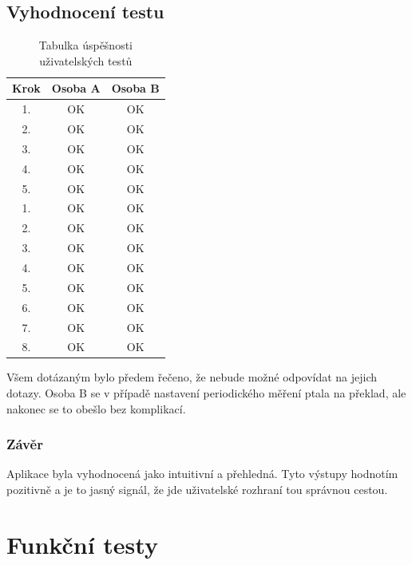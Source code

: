 \subsection{Vyhodnocení testu}

\begin{table}[h]
	\begin{center}
		\begin{tabular}{|c|c|c|}
			\hline
				{\bf Krok} & {\bf Osoba A} & {\bf Osoba B}\\
			\hline \hline
				1. & OK & OK\\
				\hline
				2. & OK & OK\\
				\hline
				3. & OK & OK\\
				\hline
				4. & OK & OK\\
				\hline
				5. & OK & OK\\
				\hline \hline
				1. & OK & OK\\
				\hline
				2. & OK & OK\\
				\hline
				3. & OK & OK\\
				\hline
				4. & OK & OK\\
				\hline
				5. & OK & OK\\
				\hline
				6. & OK & OK\\
				\hline
				7. & OK & OK\\
				\hline
				8. & OK & OK\\
				\hline
		\end{tabular}
	\end{center}
	\caption{Tabulka úspěšnosti uživatelských testů}
	\label{tab.usr}
\end{table}

Všem dotázaným bylo předem řečeno, že nebude možné odpovídat na jejich dotazy. Osoba B se v případě nastavení periodického měření ptala na překlad, ale nakonec se to obešlo bez komplikací.

\subsubsection{Závěr}
Aplikace byla vyhodnocená jako intuitivní a přehledná. Tyto výstupy hodnotím pozitivně a je to jasný signál, že jde uživatelské rozhraní tou správnou cestou.

\newpage

\section{Funkční testy}


